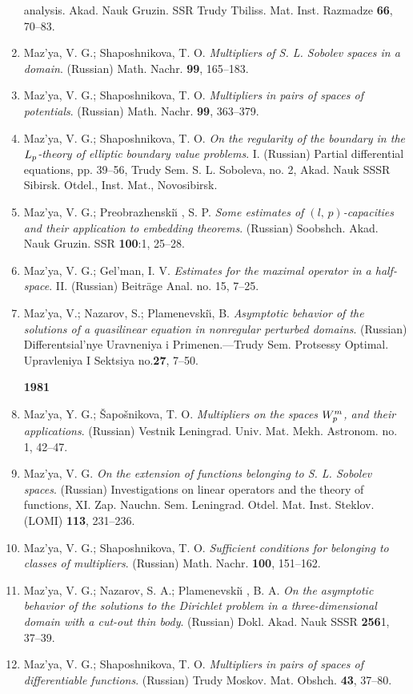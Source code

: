 \documentclass{article}
\begin{document}
\begin{enumerate}
analysis.
Akad. Nauk Gruzin. SSR Trudy Tbiliss. Mat. Inst.
Razmadze {\bf 66}, 70--83.
\item Maz'ya, V. G.; Shaposhnikova, T. O. {\it Multipliers of S. L.
Sobolev
spaces in a domain}.
(Russian) Math. Nachr. {\bf 99}, 165--183.
\item Maz'ya, V. G.; Shaposhnikova, T. O. {\it Multipliers in pairs of
spaces of potentials}.
(Russian) Math. Nachr. {\bf 99}, 363--379.
\item Maz'ya, V. G.; Shaposhnikova, T. O. {\it On the regularity of
the
boundary in the $L\sb{p}$-theory of
elliptic boundary value problems}. I. (Russian) Partial differential
equations, pp. 39--56, Trudy Sem. S. L. Soboleva, no. 2,
Akad. Nauk SSSR Sibirsk. Otdel., Inst. Mat., Novosibirsk.
\item Maz'ya, V. G.; Preobrazhenski{\u\i} , S. P. {\it Some estimates
of
$(l,\,p)$-capacities and their
application to embedding theorems}. (Russian) Soobshch. Akad. Nauk
Gruzin.
SSR {\bf 100}:1, 25--28.
\item Maz'ya, V. G.; Gel'man, I. V. {\it Estimates for the maximal
operator
in a half-space}. II.
(Russian) Beitr{\"a}ge Anal. no. 15, 7--25.
\item Maz'ya, V.; Nazarov, S.; Plamenevski\u \i , B. {\it Asymptotic
behavior of
the solutions of a quasilinear equation in nonregular perturbed
domains}.
(Russian) Differentsial'nye Uravneniya i Primenen.---Trudy
Sem. Protsessy Optimal. Upravleniya I Sektsiya no.{\bf 27},
7--50.\hfill\break

{\bf 1981}
\item Maz'ya, Y. G.; \v Sapo\v snikova, T. O. {\it Multipliers on the
spaces $W\sp{m}\sb{p}$, and their applications}.
(Russian) Vestnik Leningrad. Univ. Mat. Mekh. Astronom. no. 1, 42--47.
\item Maz'ya, V. G. {\it On the extension of functions belonging to S.
L.
Sobolev spaces}.
(Russian) Investigations on linear operators and the theory of
functions,
XI. Zap. Nauchn. Sem. Leningrad. Otdel. Mat. Inst.
Steklov. (LOMI) {\bf 113}, 231--236.
\item Maz'ya, V. G.; Shaposhnikova, T. O. {\it Sufficient conditions
for
belonging to classes of multipliers}.
(Russian) Math. Nachr. {\bf 100}, 151--162.
\item Maz'ya, V. G.; Nazarov, S. A.; Plamenevski{\u\i} , B. A. {\it On
the
asymptotic behavior of the solutions to the
  Dirichlet problem in a three-dimensional domain with a cut-out thin
body}.
(Russian) Dokl. Akad. Nauk SSSR {\bf 256}1,
37--39.
\item Maz'ya, V. G.; Shaposhnikova, T. O. {\it Multipliers in pairs of
spaces of differentiable functions}.
(Russian) Trudy Moskov. Mat. Obshch. {\bf 43}, 37--80.


\end{enumerate}
\end{document}
